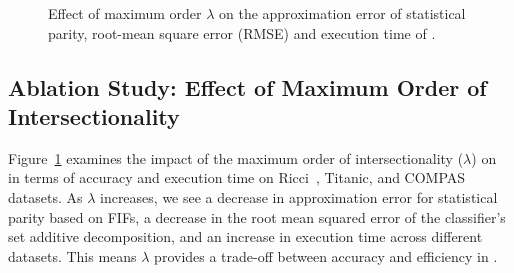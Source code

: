 \begin{figure}
	
	
	\caption[Ablation study on FIFs: effect of maximum order of intersectionality]{Effect of maximum order $ \lambda $ on the approximation error of statistical parity, root-mean square error (RMSE) and  execution time of {\fairXplainer}.}
	\label{fairness_fairXplainer_fig:effect_maxorder_appendix}
\end{figure}




\subsection{Ablation Study: Effect of Maximum Order of Intersectionality}\label{fairness_fairXplainer_sec:ablation} 
Figure~\ref{fairness_fairXplainer_fig:effect_maxorder_appendix} examines the impact of the maximum order of intersectionality ($\lambda$) on {\fairXplainer} in terms of accuracy and execution time on Ricci~\cite{mcginley2010ricci}, Titanic, and COMPAS datasets. As $\lambda$ increases, we see a decrease in approximation error for statistical parity based on FIFs, a decrease in the root mean squared error of the classifier's set additive decomposition, and an increase in execution time across different datasets. This means $\lambda$ provides a trade-off between accuracy and efficiency in {\fairXplainer}.

